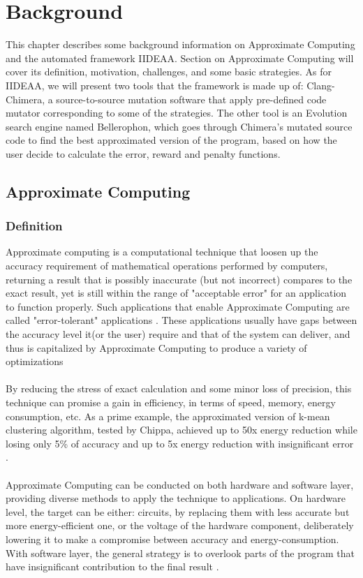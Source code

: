 \chapter{Background}

This chapter describes some background information on Approximate Computing and the automated framework IIDEAA. Section on Approximate Computing will cover its definition, motivation, challenges, and some basic strategies. As for IIDEAA, we will present two tools that the framework is made up of: Clang-Chimera, a source-to-source mutation software that apply pre-defined code mutator corresponding to some of the strategies. The other tool is an Evolution search engine named Bellerophon, which goes through Chimera's mutated source code to find the best approximated version of the program, based on how the user decide to calculate the error, reward and penalty functions.
\section{Approximate Computing}

\subsection{Definition}

Approximate computing is a computational technique that loosen up the accuracy requirement of mathematical operations performed by computers, returning a result that is possibly inaccurate (but not incorrect) compares to the exact result, yet is still within the range of "acceptable error" for an application to function properly. Such applications that enable Approximate Computing are called "error-tolerant" applications \cite{7348659}. These applications usually have gaps between the accuracy level it(or the user) require and that of the system can deliver, and thus is capitalized by Approximate Computing to produce a variety of optimizations \cite{AxCSurvey} \\
~\\
By reducing the stress of exact calculation and some minor loss of precision, this technique can promise a gain in efficiency, in terms of speed, memory, energy consumption, etc. As a prime example, the approximated version of k-mean clustering algorithm, tested by Chippa, achieved up to 50x energy reduction while losing only 5\% of accuracy and up to 5x energy reduction with insignificant error \cite{SEHD} .\\
~\\
Approximate Computing can be conducted on both hardware and software layer, providing diverse methods to apply the technique to applications. On hardware level, the target can be either: circuits, by replacing them with less accurate but more energy-efficient one, or the voltage of the hardware component, deliberately lowering it to make a compromise between accuracy and energy-consumption. With software layer, the general strategy is to overlook parts of the program that have insignificant contribution to the final result \cite{7348659}. \\

